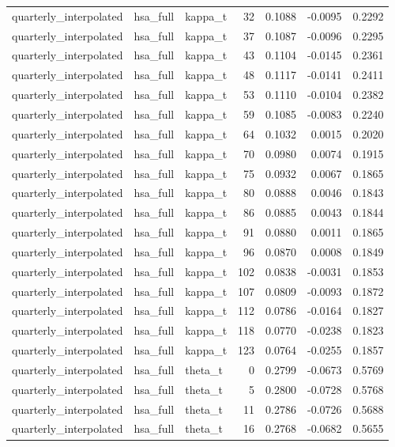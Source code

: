 \begin{tabular}{lllrrrr}
quarterly\_interpolated & hsa\_full & kappa\_t & 32 & 0.1088 & -0.0095 & 0.2292 \\
quarterly\_interpolated & hsa\_full & kappa\_t & 37 & 0.1087 & -0.0096 & 0.2295 \\
quarterly\_interpolated & hsa\_full & kappa\_t & 43 & 0.1104 & -0.0145 & 0.2361 \\
quarterly\_interpolated & hsa\_full & kappa\_t & 48 & 0.1117 & -0.0141 & 0.2411 \\
quarterly\_interpolated & hsa\_full & kappa\_t & 53 & 0.1110 & -0.0104 & 0.2382 \\
quarterly\_interpolated & hsa\_full & kappa\_t & 59 & 0.1085 & -0.0083 & 0.2240 \\
quarterly\_interpolated & hsa\_full & kappa\_t & 64 & 0.1032 & 0.0015 & 0.2020 \\
quarterly\_interpolated & hsa\_full & kappa\_t & 70 & 0.0980 & 0.0074 & 0.1915 \\
quarterly\_interpolated & hsa\_full & kappa\_t & 75 & 0.0932 & 0.0067 & 0.1865 \\
quarterly\_interpolated & hsa\_full & kappa\_t & 80 & 0.0888 & 0.0046 & 0.1843 \\
quarterly\_interpolated & hsa\_full & kappa\_t & 86 & 0.0885 & 0.0043 & 0.1844 \\
quarterly\_interpolated & hsa\_full & kappa\_t & 91 & 0.0880 & 0.0011 & 0.1865 \\
quarterly\_interpolated & hsa\_full & kappa\_t & 96 & 0.0870 & 0.0008 & 0.1849 \\
quarterly\_interpolated & hsa\_full & kappa\_t & 102 & 0.0838 & -0.0031 & 0.1853 \\
quarterly\_interpolated & hsa\_full & kappa\_t & 107 & 0.0809 & -0.0093 & 0.1872 \\
quarterly\_interpolated & hsa\_full & kappa\_t & 112 & 0.0786 & -0.0164 & 0.1827 \\
quarterly\_interpolated & hsa\_full & kappa\_t & 118 & 0.0770 & -0.0238 & 0.1823 \\
quarterly\_interpolated & hsa\_full & kappa\_t & 123 & 0.0764 & -0.0255 & 0.1857 \\
quarterly\_interpolated & hsa\_full & theta\_t & 0 & 0.2799 & -0.0673 & 0.5769 \\
quarterly\_interpolated & hsa\_full & theta\_t & 5 & 0.2800 & -0.0728 & 0.5768 \\
quarterly\_interpolated & hsa\_full & theta\_t & 11 & 0.2786 & -0.0726 & 0.5688 \\
quarterly\_interpolated & hsa\_full & theta\_t & 16 & 0.2768 & -0.0682 & 0.5655 \\

\end{tabular}
